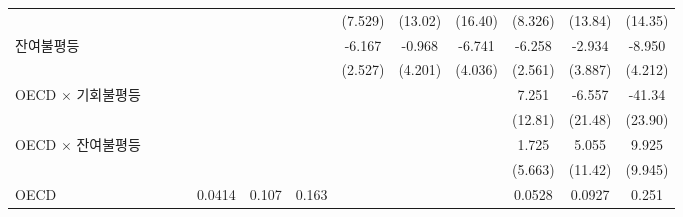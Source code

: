 \begin{table}[htbp]
{\begin{tabular}{l*{12}{c}}
                    &                     &                     &                     &                     &                     &                     &     (7.529)         &     (13.02)         &     (16.40)         &     (8.326)         &     (13.84)         &     (14.35)         \\
[1em]
잔여불평등        &                     &                     &                     &                     &                     &                     &      -6.167\sym{**} &      -0.968         &      -6.741\sym{*}  &      -6.258\sym{**} &      -2.934         &      -8.950\sym{**} \\
                    &                     &                     &                     &                     &                     &                     &     (2.527)         &     (4.201)         &     (4.036)         &     (2.561)         &     (3.887)         &     (4.212)         \\
[1em]
OECD $\times$ 기회불평등&                     &                     &                     &                     &                     &                     &                     &                     &                     &       7.251         &      -6.557         &      -41.34\sym{*}  \\
                    &                     &                     &                     &                     &                     &                     &                     &                     &                     &     (12.81)         &     (21.48)         &     (23.90)         \\
[1em]
OECD $\times$ 잔여불평등&                     &                     &                     &                     &                     &                     &                     &                     &                     &       1.725         &       5.055         &       9.925         \\
                    &                     &                     &                     &                     &                     &                     &                     &                     &                     &     (5.663)         &     (11.42)         &     (9.945)         \\
[1em]
OECD              &                     &                     &                     &      0.0414         &       0.107         &       0.163         &                     &                     &                     &      0.0528         &      0.0927         &       0.251         \\

\end{tabular}}
\end{table}
